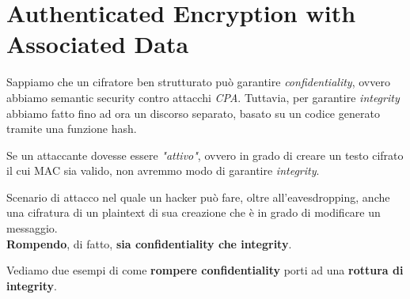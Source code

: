 \chapter{Authenticated Encryption with Associated Data}\label{chap:aead}
Sappiamo che un cifratore ben strutturato può garantire \textit{confidentiality}, ovvero abbiamo semantic security contro attacchi \textit{CPA}. Tuttavia, per garantire \textit{integrity} abbiamo fatto fino ad ora un discorso separato, basato su un codice generato tramite una funzione hash.\\ 
\begin{remark}
Se un attaccante dovesse essere \textit{"attivo"}, ovvero in grado di creare un testo cifrato il cui MAC sia valido, non avremmo modo di garantire \textit{integrity}.
\end{remark}
\begin{definition}\label{def:cca}
Scenario di attacco nel quale un hacker può fare, oltre all'eavesdropping, anche una cifratura di un plaintext di sua creazione che è in grado di modificare un messaggio.\\
\textbf{Rompendo}, di fatto, \textbf{sia confidentiality che integrity}.
\end{definition}
Vediamo due esempi di come \textbf{rompere confidentiality} porti ad una \textbf{rottura di integrity}.
